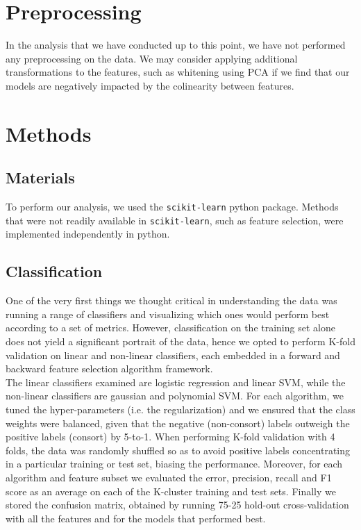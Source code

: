 \documentclass[twoside,twocolumn,paper=letter]{article}
\begin{document}
\section{Preprocessing}

In the analysis that we have conducted up to this point, we have not performed
any preprocessing on the data. We may consider applying additional
transformations to the features, such as whitening using PCA if we find that our
models are negatively impacted by the colinearity between features.

\section{Methods}
\subsection{Materials}

To perform our analysis, we used the \texttt{scikit-learn} python package. Methods
that were not readily available in \texttt{scikit-learn}, such as feature selection, were
implemented independently in python.


\subsection{Classification}
One of the very first things we thought critical in understanding the data was running a range of classifiers and visualizing which ones would perform best according to a set of metrics. However, classification on the training set alone does not yield a significant portrait of the data, hence we opted to perform K-fold validation 
on linear and non-linear classifiers, each embedded in a forward and backward feature selection algorithm framework.\\

The linear classifiers examined are logistic regression and linear SVM, while the non-linear classifiers are gaussian and polynomial SVM. For each algorithm, we tuned the hyper-parameters (i.e. the regularization) and we ensured that the class weights were balanced, given that the negative (non-consort) labels outweigh the positive labels (consort) by 5-to-1. When performing K-fold validation with 4 folds, the data was randomly shuffled so as to avoid positive labels concentrating in a particular training or test set, biasing the performance. Moreover, for each algorithm and feature subset we evaluated the error, precision, recall and F1 score as an average on each of the K-cluster training and test sets. Finally we stored the confusion matrix, obtained by running 75-25 hold-out cross-validation with all the features and for the models that performed best.
\end{document}
